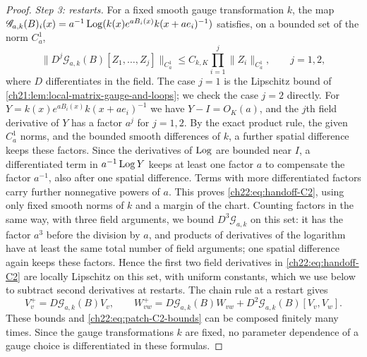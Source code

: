 \begin{proof}
\emph{Step 3: restarts.} For a fixed smooth gauge transformation $k$, the map $\mathscr G_{a,k}(B)_i(x)=a^{-1}\operatorname{Log}(k(x)e^{aB_i(x)}k(x+ae_i)^{-1})$ satisfies, on a bounded set of the norm $C_a^1$,
\begin{equation}\label{ch22:eq:handoff-C2}
 \|D^j\mathscr G_{a,k}(B)[Z_1,\ldots,Z_j]\|_{C_a^1}\le C_{k,K}\prod_{i=1}^j\|Z_i\|_{C_a^1},\qquad j=1,2,
\end{equation}
where $D$ differentiates in the field. The case $j=1$ is the Lipschitz bound of \cref{ch21:lem:local-matrix-gauge-and-loops}; we check the case $j=2$ directly. For $Y=k(x)e^{aB_i(x)}k(x+ae_i)^{-1}$ we have $Y-I=O_K(a)$, and the $j$th field derivative of $Y$ has a factor $a^j$ for $j=1,2$. By the exact product rule, the given $C_a^1$ norms, and the bounded smooth differences of $k$, a further spatial difference keeps these factors. Since the derivatives of $\operatorname{Log}$ are bounded near $I$, a differentiated term in $a^{-1}\operatorname{Log} Y$ keeps at least one factor $a$ to compensate the factor $a^{-1}$, also after one spatial difference. Terms with more differentiated factors carry further nonnegative powers of $a$. This proves \eqref{ch22:eq:handoff-C2}, using only fixed smooth norms of $k$ and a margin of the chart. Counting factors in the same way, with three field arguments, we bound $D^3\mathscr G_{a,k}$ on this set: it has the factor $a^3$ before the division by $a$, and products of derivatives of the logarithm have at least the same total number of field arguments; one spatial difference again keeps these factors. Hence the first two field derivatives in \eqref{ch22:eq:handoff-C2} are locally Lipschitz on this set, with uniform constants, which we use below to subtract second derivatives at restarts. The chain rule at a restart gives
\[
 V_v^+=D\mathscr G_{a,k}(B)V_v,\qquad
 W_{vw}^+=D\mathscr G_{a,k}(B)W_{vw}+D^2\mathscr G_{a,k}(B)[V_v,V_w].
\]
These bounds and \eqref{ch22:eq:patch-C2-bounds} can be composed finitely many times. Since the gauge transformations $k$ are fixed, no parameter dependence of a gauge choice is differentiated in these formulas.


\end{proof}
